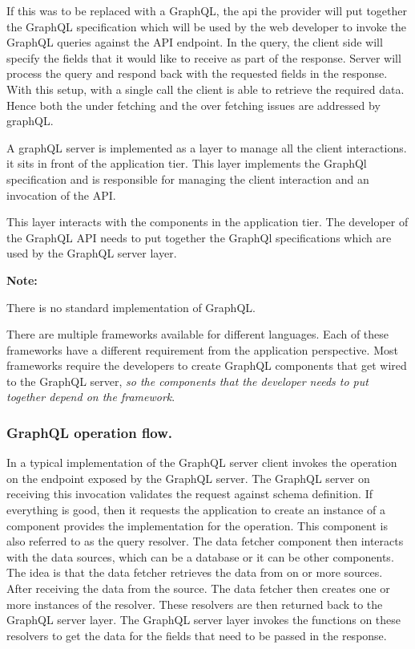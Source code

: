 \documentclass[a4paper, 11pt]{book}
\newenvironment{note}{
    \begin{siderule}
        \textbf{Note: }
        }{
    \end{siderule}
}
\begin{document}
    If this was to be replaced with a GraphQL, the api the provider will put together the GraphQL specification which will be used by the web developer to invoke the GraphQL queries against the API endpoint.
    In the query, the client side will specify the fields that it would like to receive as part of the response.
    Server will process the query and respond back with the requested fields in the response.
    With this setup, with a single call the client is able to retrieve the required data.
    Hence both the under fetching and the over fetching issues are addressed by graphQL.

    A graphQL server is implemented as a layer to manage all the client interactions.
    it sits in front of the application tier.
    This layer implements the GraphQl specification and is responsible for managing the client interaction and an invocation of the API.

    This layer interacts with the components in the application tier.
    The developer of the GraphQL API needs to put together the GraphQl specifications which are used by the GraphQL server layer.

    \begin{note}
        There is no standard implementation of GraphQL.
    \end{note}

    There are multiple frameworks available for different languages.
    Each of these frameworks have a different requirement from the application perspective.
    Most frameworks require the developers to create GraphQL components that get wired to the GraphQL server, \textit{so the components that the developer needs to put together depend on the framework}.

    \subsubsection{GraphQL operation flow.}
    In a typical implementation of the GraphQL server client invokes the operation on the endpoint exposed by the GraphQL server.
    The GraphQL server on receiving this invocation validates the request against schema definition.
    If everything is good, then it requests the application to create an instance of a component provides the implementation for the operation.
    This component is also referred to as the query resolver.
    The data fetcher component then interacts with the data sources, which can be a database or it can be other components.
    The idea is that the data fetcher retrieves the data from on or more sources.
    After receiving the data from the source.
    The data fetcher then creates one or more instances of the resolver.
    These resolvers are then returned back to the GraphQL server layer.
    The GraphQL server layer invokes the functions on these resolvers to get the data for the fields that need to be passed in the response.
\end{document}
